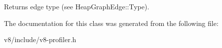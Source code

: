 Returns edge type (see Heap\-Graph\-Edge\-::\-Type). 

The documentation for this class was generated from the following file\-:\begin{DoxyCompactItemize}
\item 
v8/include/v8-\/profiler.\-h\end{DoxyCompactItemize}
